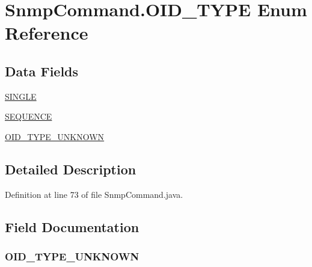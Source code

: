 \hypertarget{enummib2bib_1_1_snmp_command_1_1_o_i_d___t_y_p_e}{}\section{Snmp\+Command.\+O\+I\+D\+\_\+\+T\+Y\+P\+E Enum Reference}
\label{enummib2bib_1_1_snmp_command_1_1_o_i_d___t_y_p_e}
\subsection*{Data Fields}
\begin{DoxyCompactItemize}
\item 
\hyperlink{enummib2bib_1_1_snmp_command_1_1_o_i_d___t_y_p_e_a76b06276bbadc1b8d9e716c5d9326919}{S\+I\+N\+G\+L\+E}
\item 
\hyperlink{enummib2bib_1_1_snmp_command_1_1_o_i_d___t_y_p_e_a1a901676be44d13a4e77045512d9fb99}{S\+E\+Q\+U\+E\+N\+C\+E}
\item 
\hyperlink{enummib2bib_1_1_snmp_command_1_1_o_i_d___t_y_p_e_a1b3d495b9481a28db662ba416aaa5af4}{O\+I\+D\+\_\+\+T\+Y\+P\+E\+\_\+\+U\+N\+K\+N\+O\+W\+N}
\end{DoxyCompactItemize}


\subsection{Detailed Description}


Definition at line 73 of file Snmp\+Command.\+java.



\subsection{Field Documentation}
\hypertarget{enummib2bib_1_1_snmp_command_1_1_o_i_d___t_y_p_e_a1b3d495b9481a28db662ba416aaa5af4}{}
\subsubsection[{O\+I\+D\+\_\+\+T\+Y\+P\+E\+\_\+\+U\+N\+K\+N\+O\+W\+N}]{\setlength{\rightskip}{0pt plus 5cm}O\+I\+D\+\_\+\+T\+Y\+P\+E\+\_\+\+U\+N\+K\+N\+O\+W\+N}\label{enummib2bib_1_1_snmp_command_1_1_o_i_d___t_y_p_e_a1b3d495b9481a28db662ba416aaa5af4}



